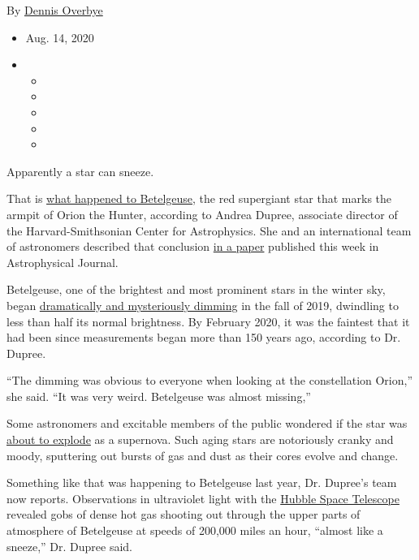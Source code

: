 By \href{https://www.nytimes3xbfgragh.onion/by/dennis-overbye}{Dennis
Overbye}

\begin{itemize}
\item
  Aug. 14, 2020
\item
  \begin{itemize}
  \item
  \item
  \item
  \item
  \item
  \end{itemize}
\end{itemize}

Apparently a star can sneeze.

That is
\href{https://www.nytimes3xbfgragh.onion/interactive/2020/01/09/science/betelgeuse-supernova-fading.html}{what
happened to Betelgeuse}, the red supergiant star that marks the armpit
of Orion the Hunter, according to Andrea Dupree, associate director of
the Harvard-Smithsonian Center for Astrophysics. She and an
international team of astronomers described that conclusion
\href{https://iopscience.iop.org/article/10.3847/1538-4357/aba516}{in a
paper} published this week in Astrophysical Journal.

Betelgeuse, one of the brightest and most prominent stars in the winter
sky, began
\href{https://www.nytimes3xbfgragh.onion/2020/01/09/science/astronomy-supernova-betelgeuse.html}{dramatically
and mysteriously dimming} in the fall of 2019, dwindling to less than
half its normal brightness. By February 2020, it was the faintest that
it had been since measurements began more than 150 years ago, according
to Dr. Dupree.

``The dimming was obvious to everyone when looking at the constellation
Orion,'' she said. ``It was very weird. Betelgeuse was almost missing,''

Some astronomers and excitable members of the public wondered if the
star was
\href{https://www.nytimes3xbfgragh.onion/interactive/2020/01/09/science/betelgeuse-supernova-fading.html}{about
to explode} as a supernova. Such aging stars are notoriously cranky and
moody, sputtering out bursts of gas and dust as their cores evolve and
change.

Something like that was happening to Betelgeuse last year, Dr. Dupree's
team now reports. Observations in ultraviolet light with the
\href{https://www.nytimes3xbfgragh.onion/2020/04/24/science/hubble-telescope-30th-birthday.html}{Hubble
Space Telescope} revealed gobs of dense hot gas shooting out through the
upper parts of atmosphere of Betelgeuse at speeds of 200,000 miles an
hour, ``almost like a sneeze,'' Dr. Dupree said.

